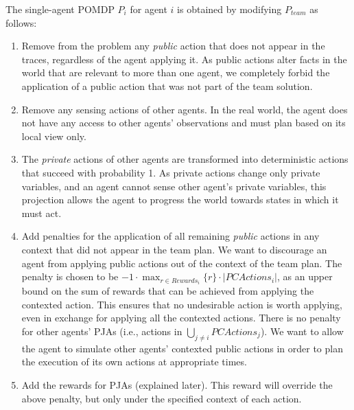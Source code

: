 \documentclass[letterpaper]{article} %
\newcommand{\eliran}[1]{\textbf{[\color{red}ELIRAN:#1]}}
\newcommand{\ronen}[1]{\textbf{[\color{blue}RONEN:#1]}}
\begin{document}
The single-agent POMDP $P_i$ for agent $i$ is obtained by modifying $P_{team}$
as follows:
\begin{enumerate}
\item Remove from the problem any \emph{public} action that does not appear in the traces, regardless of the agent applying it. As public actions alter facts in the world that are relevant to more than one agent, we completely forbid the application of a public action that was not part of the team solution.
\item Remove any sensing actions of other agents.
In the real world, the agent does not have any access to other agents' observations and must plan based on its local view only.
\item The \emph{private} actions of other agents are transformed into deterministic actions that succeed with probability 1.
As private actions change only private variables, and an agent cannot sense other agent's private variables, this projection allows the agent to progress the world towards states in which it must act.
\item Add penalties for the application of all remaining \emph{public} actions in any context that did not appear in the team plan. We want to discourage an agent from applying public actions out of the context of the team plan. The penalty is chosen to be $-1\cdot\max_{r\in Rewards_i}\{r\} \cdot|PCActions_i|$, as an upper bound on the sum of rewards that can be achieved from applying the contexted action. This ensures that no undesirable action is worth applying, even in exchange for applying all the contexted actions. There is no penalty for other agents' PJAs
(i.e., actions in $\bigcup_{j\neq i} PCActions_j$). We want
to allow the agent to simulate other agents' contexted public actions in order to plan the execution of its own
actions at appropriate times.
\item Add the rewards for PJAs (explained later).
This reward will override the above penalty, but only under the specified context of each action. 

\end{enumerate}
\end{document}
